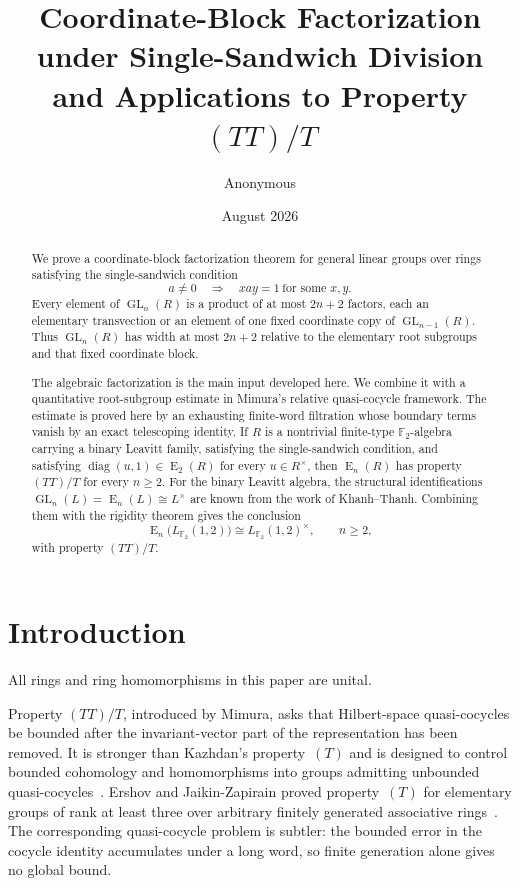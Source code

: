 \documentclass[11pt]{amsart}
\title[Coordinate-block factorization and \texorpdfstring{\((TT)/T\)}{(TT)/T}]
{Coordinate-Block Factorization under Single-Sandwich Division
and Applications to Property \texorpdfstring{\((TT)/T\)}{(TT)/T}}
\author{Anonymous}
\date{August 2026}
\theoremstyle{definition}
\theoremstyle{plain}
\newcommand{\F}{\mathbb F}
\newcommand{\GL}{\operatorname{GL}}
\newcommand{\EL}{\operatorname{E}}
\newcommand{\diag}{\operatorname{diag}}
\begin{document}
\begin{abstract}
We prove a coordinate-block factorization theorem for general linear
groups over rings satisfying the single-sandwich condition
\[
  a\ne0\quad\Longrightarrow\quad
  xay=1\ \text{for some }x,y.
\]
Every element of \(\GL_n(R)\) is a product of at most \(2n+2\)
factors, each an elementary transvection or an element of one fixed
coordinate copy of \(\GL_{n-1}(R)\).  Thus \(\GL_n(R)\) has width at
most \(2n+2\) relative to the elementary root subgroups and that
fixed coordinate block.

The algebraic factorization is the main input developed here.  We
combine it with a quantitative root-subgroup estimate in Mimura's
relative quasi-cocycle framework.  The estimate is proved here by an
exhausting finite-word filtration whose boundary terms vanish by an
exact telescoping identity.  If \(R\) is a nontrivial finite-type
\(\F_2\)-algebra carrying a binary Leavitt family, satisfying the
single-sandwich condition, and satisfying
\(\diag(u,1)\in\EL_2(R)\) for every \(u\in R^\times\), then
\(\EL_n(R)\) has property \((TT)/T\) for every \(n\ge2\).
For the binary Leavitt algebra, the structural identifications
\(\GL_n(L)=\EL_n(L)\cong L^\times\) are known from the work of
Khanh--Thanh.  Combining them with the rigidity theorem gives the
conclusion
\[
  \EL_n\bigl(L_{\F_2}(1,2)\bigr)
  \cong L_{\F_2}(1,2)^\times,
  \qquad n\ge2,
\]
with property \((TT)/T\).
\end{abstract}

\maketitle

\section{Introduction}\label{sec:introduction}

All rings and ring homomorphisms in this paper are unital.

Property \((TT)/T\), introduced by Mimura, asks that Hilbert-space
quasi-cocycles be bounded after the invariant-vector part of the
representation has been removed.  It is stronger than Kazhdan's
property~\((T)\) and is designed to control bounded cohomology and
homomorphisms into groups admitting unbounded
quasi-cocycles~\cite{MimuraTT}.  Ershov and Jaikin-Zapirain proved property~\((T)\)
for elementary groups of rank at least three over arbitrary finitely
generated associative rings~\cite{ErshovJaikin}.  The corresponding quasi-cocycle problem
is subtler: the bounded error in the cocycle identity accumulates
under a long word, so finite generation alone gives no global bound.
\end{document}
